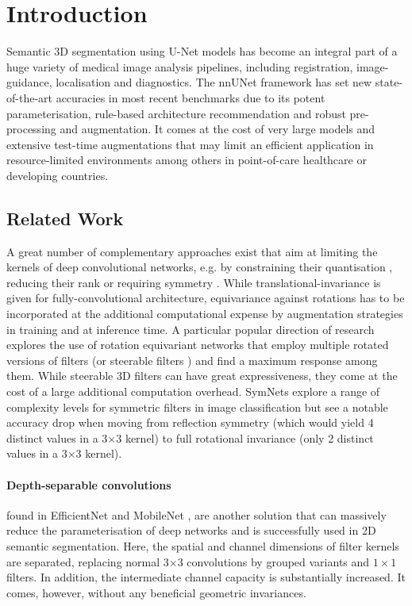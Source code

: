 \section{Introduction}
    \label{sec:intro}
    Semantic 3D segmentation using U-Net models has become an integral part of a huge variety of medical image analysis pipelines, including registration, image-guidance, localisation and diagnostics. The nnUNet framework \cite{isensee2021nnu} has set new state-of-the-art accuracies in most recent benchmarks due to its potent parameterisation, rule-based architecture recommendation and robust pre-processing and augmentation. It comes at the cost of very large models and extensive test-time augmentations that may limit an efficient application in resource-limited environments among others in point-of-care healthcare or developing countries.

    \subsection{Related Work}
        A great number of complementary approaches exist that aim at limiting the kernels of deep convolutional networks, e.g. by constraining their quantisation \cite{zhang2021medq}, reducing their rank \cite{jaderberg2014speeding} or requiring symmetry \cite{marcos2016learning}. While translational-invariance is given for fully-convolutional architecture, equivariance against rotations has to be incorporated at the additional computational expense by augmentation strategies in training and at inference time. A particular popular direction of research explores the use of rotation equivariant networks \cite{cohen2016group} that employ multiple rotated versions of filters \cite{bekkers2018roto,dieleman2016exploiting} (or steerable filters \cite{weiler20183d}) and find a maximum response among them. While steerable 3D filters can have great expressiveness, they come at the cost of a large additional computation overhead. SymNets \cite{dzhezyan2021symmetrical} explore a range of complexity levels for symmetric filters in image classification but see a notable accuracy drop when moving from reflection symmetry (which would yield 4 distinct values in a 3$\times$3 kernel) to full rotational invariance (only 2 distinct values in a 3$\times$3 kernel).

        \paragraph{Depth-separable convolutions} found in EfficientNet and MobileNet \cite{howard2019searching}, are another solution that can massively reduce the parameterisation of deep networks and is successfully used in 2D semantic segmentation. Here, the spatial and channel dimensions of filter kernels are separated, replacing normal 3$\times$3 convolutions by grouped variants and $1\times1$ filters. In addition, the intermediate channel capacity is substantially increased. It comes, however, without any beneficial geometric invariances.

